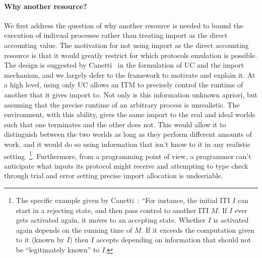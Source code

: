 \paragraph{Why another resource?} 
We first address the question of why another resource is needed to bound the execution of indivual processes rather than treating import as the direct accounting value.
The motivation for not using import as the direct accounting resource is that it would greatly restrict for which protocols emulation is possible.
The design is suggested by Canetti~\cite{canettiUC} in the formulation of UC and the import mechanism, and we largely defer to the framework to motivate and explain it.
At a high level, using only UC allows an ITM to precisely control the runtime of another that it gives import to. Not only is this information unknown apriori, but assuming that the precise runtime of an arbitrary process is unrealistic.
The environment, with this ability, gives the same import to the real and ideal worlds such that one terminates and the other does not. 
This would allow it to distinguish between the two worlds as long as they perform different amounts of work, and it would do so using information that isn't know to it in any realistic setting. 
\footnote{The specific example given by Canetti~\cite{canettiUC}: ``For instance, the initial ITI $I$ can start in a rejecting state, and then pass control to another ITI $M$. If $I$ ever gets activated again, it moves to an accepting state. Whether $I$ is activated again depends on the running time of $M$. If it exceeds the computation given to it (known by $I$) then $I$ accepts depending on information that should not be ``legitimately known'' to $I$.}.
Furthermore, from a programming point of view, a programmer can't anticipate what inputs its protocol might receive and attempting to type check through trial and error setting precise import allocation is undesriable.

